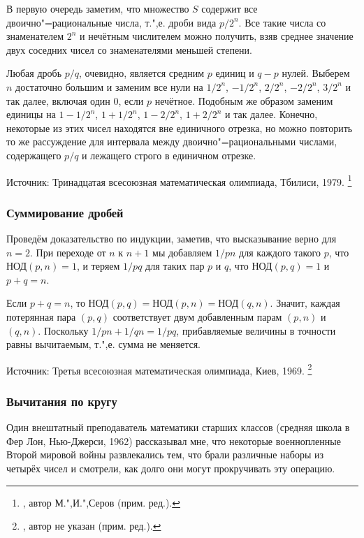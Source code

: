 \documentclass[twoside]{book}
\begin{document}
В первую очередь заметим, что множество $S$ содержит все двоично"=рациональные числа, 
т.",е. дроби вида $p/2^n$.
Все такие числа со знаменателем $2^n$ и нечётным числителем можно получить, взяв среднее значение двух соседних чисел со знаменателями меньшей степени.

Любая дробь $p/q$, очевидно, является средним $p$ единиц и $q-p$ нулей.
Выберем $n$ достаточно большим и заменим все нули на $1/2^n$, $-1/2^n$, $2/2^n$, $-2/2^n$, $3/2^n$ и так далее, включая один $0$, если $p$ нечётное.
Подобным же образом заменим единицы на $1-1/2^n$, $1+1/2^n$, $1-2/2^n$, $1+2/2^n$ и так далее.
Конечно, некоторые из этих чисел находятся вне единичного отрезка, но можно повторить то же рассуждение для интервала между двоично"=рациональными числами, содержащего $p/q$ и лежащего строго в единичном отрезке.%
\heart

\medskip
{\small 
Источник: Тринадцатая всесоюзная математическая олимпиада, Тбилиси, 1979.%
\footnote{\cite[№272]{ВсМО}, автор  М.",И.",Серов (прим. ред.).}

}
\subsubsection*{Суммирование дробей}%

Проведём доказательство по индукции, заметив, что высказывание верно для $n=2$.
При переходе от $n$ к $n+1$ мы добавляем $1/pn$ для каждого такого $p$, что $\text{НОД}(p,n)=1$, и теряем $1/pq$ для таких пар $p$ и $q$, что $\text{НОД}(p,q)=1$ и $p+q=n$.

Если $p+q=n$, то
$\text{НОД}(p,q)=\text{НОД}(p,n)=\text{НОД}(q,n)$.
Значит, каждая потерянная пара $(p,q)$ соответствует двум добавленным парам $(p,n)$ и $(q,n)$.
Поскольку $1/pn+1/qn=1/pq$, прибавляемые величины в точности равны вычитаемым, т.",е. сумма не меняется.
\heart

\medskip
{\small 
Источник: Третья всесоюзная математическая олимпиада, Киев, 1969.%
\footnote{\cite[№120]{ВсМО}, автор не указан (прим. ред.).}

}
\subsubsection*{Вычитания по кругу}%

Один внештатный преподаватель математики старших классов (средняя школа в Фер Лон, Нью-Джерси, 1962)
рассказывал мне,
что некоторые военнопленные Второй мировой войны развлекались тем, что брали различные наборы из четырёх чисел и смотрели, как долго они могут прокручивать эту операцию.
\end{document}

